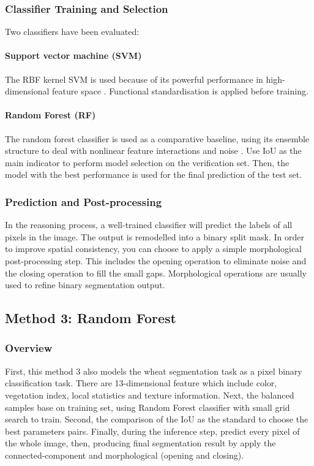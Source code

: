 \documentclass[conference]{IEEEtran}
\begin{document}
\subsubsection{Classifier Training and Selection}
Two classifiers have been evaluated:
\paragraph{Support vector machine (SVM)}
The RBF kernel SVM is used because of its powerful performance in high-dimensional feature space \cite{svm}. Functional standardisation is applied before training.
\paragraph{Random Forest (RF)}
The random forest classifier is used as a comparative baseline, using its ensemble structure to deal with nonlinear feature interactions and noise \cite{rf}.
Use IoU as the main indicator to perform model selection on the verification set. Then, the model with the best performance is used for the final prediction of the test set.
\subsubsection{Prediction and Post-processing}
In the reasoning process, a well-trained classifier will predict the labels of all pixels in the image. The output is remodelled into a binary split mask.
In order to improve spatial consistency, you can choose to apply a simple morphological post-processing step. This includes the opening operation to eliminate noise and the closing operation to fill the small gaps. Morphological operations are usually used to refine binary segmentation output.


\subsection{Method 3: Random Forest}
\subsubsection{Overview}
First, this method 3 also models the wheat segmentation task as a pixel binary classification task. There are 13-dimensional feature which include color, vegetation index, local statistics and texture information. Next, the balanced samples base on training set, using Random Forest classifier with small grid search to train. Second, the comparison of the IoU as the standard to choose the best parameters pairs. Finally, during the inference step, predict every pixel of the whole image, then, producing final segmentation result by apply the connected-component and morphological (opening and closing).
\end{document}
